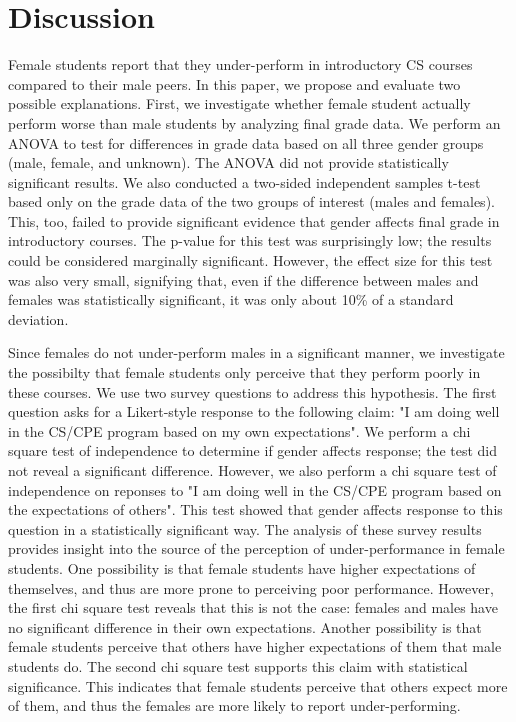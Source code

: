 \documentclass[a4paper,man,natbib]{apa6}
\begin{document}
\section{Discussion}
Female students report that they under-perform in introductory CS courses
compared to their male peers. In this paper, we propose and evaluate two
possible explanations. First, we investigate whether female student actually
perform worse than male students by analyzing final grade data. We perform an
ANOVA to test for differences in grade data based on all three gender groups
(male, female, and unknown). The ANOVA did not provide statistically
significant results. We also conducted a two-sided independent samples t-test
based only on the grade data of the two groups of interest (males and females).
This, too, failed to provide significant evidence that gender affects final
grade in introductory courses. The p-value for this test was surprisingly low;
the results could be considered marginally significant. However, the effect
size for this test was also very small, signifying that, even if the difference
between males and females was statistically significant, it was only about 10\%
of a standard deviation.

Since females do not under-perform males in a significant manner, we
investigate the possibilty that female students only perceive that they perform
poorly in these courses. We use two survey questions to address this
hypothesis. The first question asks for a Likert-style response to the
following claim: "I am doing well in the CS/CPE program based on my own
expectations". We perform a chi square test of independence to determine if
gender affects response; the test did not reveal a significant difference.
However, we also perform a chi square test of independence on reponses to "I am
doing well in the CS/CPE program based on the expectations of others". This
test showed that gender affects response to this question in a statistically
significant way. The analysis of these survey results provides insight into the
source of the perception of under-performance in female students. One
possibility is that female students have higher expectations of themselves, and
thus are more prone to perceiving poor performance. However, the first chi
square test reveals that this is not the case: females and males have no
significant difference in their own expectations. Another possibility is that
female students perceive that others have higher expectations of them that male
students do. The second chi square test supports this claim with statistical
significance. This indicates that female students perceive that others expect more of
them, and thus the females are more likely to report under-performing.
\end{document}
